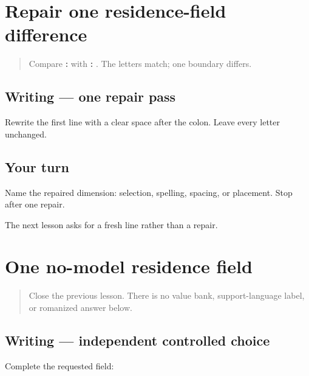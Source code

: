 \section[\texorpdfstring{\pa{ਰਿਹਾਇਸ਼}: \pa{ਸ਼ਹਿਰ} (residence field repair)}{ਰਿਹਾਇਸ਼: ਸ਼ਹਿਰ (residence field repair)}]{Repair one residence-field difference}

\label{lesson:PA-W04-residence-repair}



\begin{quote}
Compare \textbf{:} with \textbf{: }. The letters match; one boundary differs.
\end{quote}

\subsection*{Writing — one repair pass}
Rewrite the first line with a clear space after the colon. Leave every letter unchanged.

\subsection*{Your turn}
Name the repaired dimension: selection, spelling, spacing, or placement. Stop after one repair.

\begin{tcolorbox}[breakable,colback=teal!4,colframe=teal!35!black,title={Before you move on}]
The next lesson asks for a fresh line rather than a repair.
\end{tcolorbox}
\section[\texorpdfstring{\pa{ਰਿਹਾਇਸ਼}: \_\_\_\_\_\_\_\_\_\_ (residence field)}{ਰਿਹਾਇਸ਼: \_\_\_\_\_\_\_\_\_\_ (residence field)}]{One no-model residence field}

\label{lesson:PA-W04-residence-no-model}



\begin{quote}
Close the previous lesson. There is no value bank, support-language label, or romanized answer below.
\end{quote}

\subsection*{Writing — independent controlled choice}
Complete the requested field:

